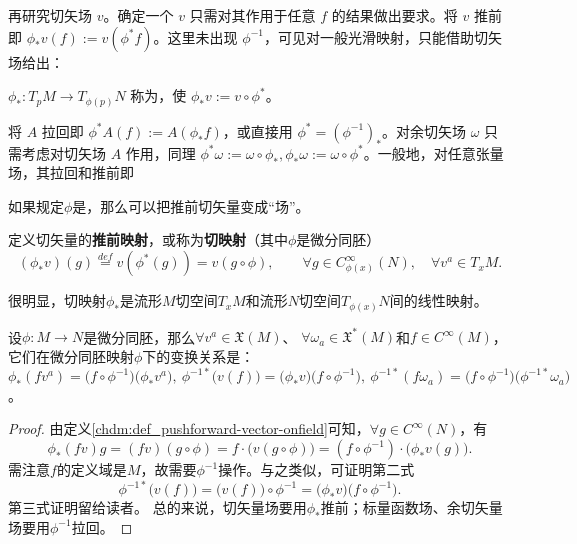 再研究切矢场 $v$。确定一个 $v$ 只需对其作用于任意 $f$ 的结果做出要求。将 $v$ 推前即 $\phi_* v(f):=v(\phi^* f)$。这里未出现 $\phi^{-1}$，可见对一般光滑映射，只能借助切矢场给出：
\begin{definition}
    $\phi_*:T_p M\to T_{\phi(p)}N$ 称为，使 $\phi_* v:=v\circ \phi^*$。
\end{definition}

将 $A$ 拉回即 $\phi^* A(f):=A(\phi_* f)$，或直接用 $\phi^*=(\phi^{-1})_*$。对余切矢场 $\omega$ 只需考虑对切矢场 $A$ 作用，同理 $\phi^* \omega:=\omega\circ\phi_*,\phi_* \omega:=\omega\circ\phi^*$。一般地，对任意张量场，其拉回和推前即

如果规定$\phi$是，那么可以把推前切矢量变成“场”。
\begin{definition}\label{chdm:def_pushforward-vector-onfield}
    定义切矢量的\textbf{推前映射}，或称为\textbf{切映射}（其中$\phi$是微分同胚）
    \begin{equation}\label{chdm:eqn_pushforward-vector-onfield}
        (\phi_{*}v)(g) \overset{def}{=} v(\phi^{*}(g)) = v (g \circ \phi), 
        \qquad \forall g\in C^\infty_{\phi(x)}(N),\quad \forall v^a \in T_{x}M .
    \end{equation}
\end{definition}
很明显，切映射$\phi_{*}$是流形$M$切空间$T_xM$和流形$N$切空间$T_{\phi(x)}N$间的线性映射。

\begin{proposition}\label{chdm:thm_fxxf}
    设$\phi:M\to N$是微分同胚，那么$\forall v^a \in\mathfrak{X}(M)$、
    $\forall \omega_a \in\mathfrak{X}^{*}(M)$和$f\in C^\infty(M)$，
    它们在微分同胚映射$\phi$下的变换关系是：
    $    \phi_{*} (f v^a) = \bigl(f\circ\phi^{-1}\bigr) \bigl( \phi_{*} v^a \bigr), \
        \phi^{-1*} \bigl(v(f)\bigr) = \bigl( \phi_{*} v \bigr)
        \bigl(f\circ\phi^{-1}\bigr), \
        \phi^{-1*}(f \omega_a) = \bigl(f\circ\phi^{-1}\bigr)\bigl(\phi^{-1*}\omega_a\bigr) 
    $。
\end{proposition}
\begin{proof}
    由定义\ref{chdm:def_pushforward-vector-onfield}可知，$\forall g\in C^\infty(N)$，有
    \begin{equation}
        \phi_{*} (f v) g = (f v)(g\circ \phi) =f\cdot \bigl(v(g\circ \phi)\bigr)
        =(f\circ \phi^{-1})\cdot \bigl(\phi_{*} v(g)\bigr).
    \end{equation}
    需注意$f$的定义域是$M$，故需要$\phi^{-1}$操作。与之类似，可证明第二式
    \begin{equation}
        \phi^{-1*} \bigl(v(f)\bigr) = \bigl(v(f)\bigr) \circ \phi^{-1}
        =\bigl( \phi_{*} v \bigr)  \bigl(f\circ\phi^{-1}\bigr) .
    \end{equation}
    第三式证明留给读者。
    总的来说，切矢量场要用$\phi_{*}$推前；标量函数场、余切矢量场要用$\phi^{-1}$拉回。
\end{proof}


